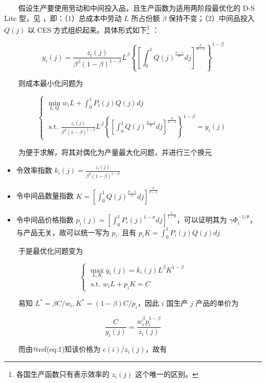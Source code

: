 \documentclass[]{tufte-handout}
\providecommand{\tightlist}{%
  \setlength{\itemsep}{0pt}\setlength{\parskip}{0pt}}
\begin{document}
　　假设生产要使用劳动和中间投入品，且生产函数为适用两阶段最优化的 D-S
Lite 型，见 \citet{DS1977} ，即：（1）总成本中劳动 \(L\) 所占份额
\(\beta\) 保持不变；（2）中间品投入 \(Q(j)\) 以 CES
方式组织起来。具体形式如下\footnote{各国生产函数只有表示效率的
  \(z_i(j)\) 这个唯一的区别。} ：

\[
y_{i}(j)=\frac{z_{i}(j)}{\beta^{\beta}(1-\beta)^{1-\beta}} L^{\beta}\left\{\left[\int_{0}^{1} Q(j)^{\frac{\sigma-1}{\sigma}} d j\right]^{\frac{\sigma}{\sigma-1}}\right\}^{1-\beta}
\]

　　则成本最小化问题为

\[
\left\{\begin{array}{c}
{\min_{L, Q} w_{i}L + \int_{0}^{1} P_{i}(j)Q(j) d j} \\ {\text { s.t. }\frac{z_{i}(j)}{\beta^{\beta}(1-\beta)^{1-\beta}} L^{\beta}\left\{\left[\int_{0}^{1} Q(j)^{\frac{\sigma-1}{\sigma}} d j\right]^{\frac{\sigma}{\sigma-1}}\right\}^{1-\beta}=y_{i}(j)}
\end{array}\right.
\]

　　为便于求解，将其对偶化为产量最大化问题，并进行三个换元

\begin{itemize}
\tightlist
\item
  令效率指数
  \(k_{i}(j)=\frac{z_{i}(j)}{\beta^{\beta}(1-\beta)^{1-\beta}}\)
\item
  令中间品数量指数
  \(K=\left[\int_{0}^{1} Q(j)^{\frac{\sigma-1}{\sigma}} d j\right]^{\frac{\sigma}{\sigma-1}}\)
\item
  令中间品价格指数
  \(p_{i}(j)=\left[\int_{0}^{1} P_{i}(j)^{1-\sigma} d j\right]^{\frac{1}{1-\sigma}}\)，可以证明其为
  \(\gamma \Phi_{i}^{-1 / \theta}\)，与产品无关，故可以统一写为
  \(p_{i}\). 且有 \(p_{i}K=\int_{0}^{1} P_{i}(j)Q(j) d j\)
\end{itemize}

　　于是最优化问题变为

\[
\left\{\begin{array}{c}
{\max_{L, K} y_{i}(j)=k_{i}(j)L^{\beta}K^{1-\beta}} \\ {\text { s.t. } w_{i}L + p_{i}K = C}
\end{array}\right.
\]

　　易知 \(L^*=\beta C/w_i, K^*=(1-\beta)C/p_i\)，因此 \(i\) 国生产
\(j\) 产品的单价为

\[\frac{C}{y_{i}(j)}=\frac{w_{i}^{\beta}p_{i}^{1-\beta}}{z_{i}(j)}\]

　　而由@ref(eq:1)知该价格为 \(c(i)/{z_{i}(j)}\)，故有
\end{document}
